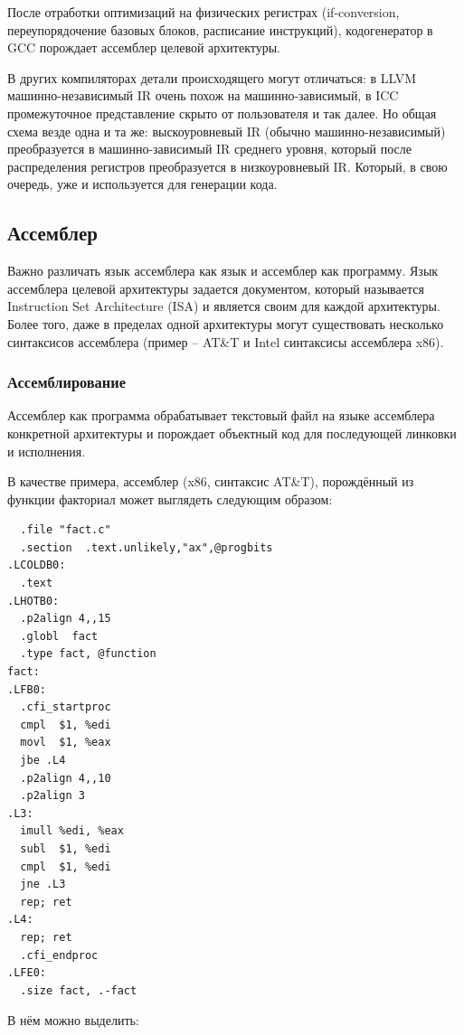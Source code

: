 \documentclass[a4paper,12pt,oneside]{article}
\begin{document}
После отработки оптимизаций на физических регистрах (if-conversion, переупорядочение базовых блоков, расписание инструкций), кодогенератор в GCC порождает ассемблер целевой архитектуры.

В других компиляторах детали происходящего могут отличаться: в LLVM машинно-независимый IR очень похож на машинно-зависимый, в ICC промежуточное представление скрыто от пользователя и так далее. Но общая схема везде одна и та же: выскоуровневый IR (обычно машинно-независимый) преобразуется в машинно-зависимый IR среднего уровня, который после распределения регистров преобразуется в низкоуровневый IR. Который, в свою очередь, уже и используется для генерации кода.

\pagebreak
\subsection{Ассемблер}

Важно различать язык ассемблера как язык и ассемблер как программу. Язык ассемблера целевой архитектуры задается документом, который называется Instruction Set Architecture (ISA) и является своим для каждой архитектуры. Более того, даже в пределах одной архитектуры могут существовать несколько синтаксисов ассемблера (пример -- AT\&T и Intel синтаксисы ассемблера x86).

\subsubsection{Ассемблирование}

Ассемблер как программа обрабатывает текстовый файл на языке ассемблера конкретной архитектуры и порождает объектный код для последующей линковки и исполнения.

В качестве примера, ассемблер (x86, синтаксис AT\&T), порождённый из функции факториал может выглядеть следующим образом:

\begin{verbatim}
  .file "fact.c"
  .section  .text.unlikely,"ax",@progbits
.LCOLDB0:
  .text
.LHOTB0:
  .p2align 4,,15
  .globl  fact
  .type fact, @function
fact:
.LFB0:
  .cfi_startproc
  cmpl  $1, %edi
  movl  $1, %eax
  jbe .L4
  .p2align 4,,10
  .p2align 3
.L3:
  imull %edi, %eax
  subl  $1, %edi
  cmpl  $1, %edi
  jne .L3
  rep; ret
.L4:
  rep; ret
  .cfi_endproc
.LFE0:
  .size fact, .-fact
\end{verbatim}

В нём можно выделить: 
\end{document}
